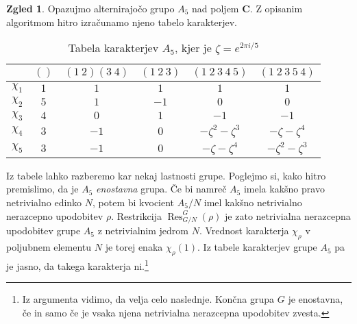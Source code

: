 \documentclass[11pt]{book}
\def\CC{\mathbf{C}}
\DeclareMathOperator\Res{Res}
\theoremstyle{definition}
\theoremstyle{zgled}
\newtheorem*{zgled}{Zgled}
\theoremstyle{odprtproblem}
\theoremstyle{domacanaloga}
\theoremstyle{izrek}
\begin{document}
\begin{zgled}
Opazujmo alternirajočo grupo $A_5$ nad poljem $\CC$. Z opisanim algoritmom hitro izračunamo njeno tabelo karakterjev.

\begin{table}[t]
    \centering
\begin{tabular}{c|ccccc}
    & $()$ & $(1 \ 2)(3 \ 4)$ & $(1 \ 2 \ 3)$ & $(1 \ 2 \ 3 \ 4 \ 5)$ & $(1 \ 2 \ 3 \ 5 \ 4)$ \\ \hline
    $\chi_1$ & $1$ & $1$ & $1$ & $1$ & $1$ \\
    $\chi_2$ & $5$ & $1$ & $-1$ & $0$ & $0$ \\
    $\chi_3$ & $4$ & $0$ & $1$ & $-1$ & $-1$ \\
    $\chi_4$ & $3$ & $-1$ & $0$ & $-\zeta^2-\zeta^3$ & $-\zeta-\zeta^4$ \\
    $\chi_5$ & $3$ & $-1$ & $0$ & $-\zeta-\zeta^4$ & $-\zeta^2-\zeta^3$ \\
\end{tabular}
\caption{Tabela karakterjev $A_5$, kjer je $\zeta = e^{2 \pi i / 5}$}
\end{table}

Iz tabele lahko razberemo kar nekaj lastnosti grupe. Poglejmo si, kako hitro premislimo, da je $A_5$ \emph{enostavna} grupa. Če bi namreč $A_5$ imela kakšno pravo netrivialno edinko $N$, potem bi kvocient $A_5/N$ imel kakšno netrivialno nerazcepno upodobitev $\rho$. Restrikcija $\Res^G_{G/N}(\rho)$ je zato netrivialna nerazcepna upodobitev grupe $A_5$ z netrivialnim jedrom $N$. Vrednost karakterja $\chi_{\rho}$ v poljubnem elementu $N$ je torej enaka $\chi_{\rho}(1)$. Iz tabele karakterjev grupe $A_5$ pa je jasno, da takega karakterja ni.\footnote{Iz argumenta vidimo, da velja celo naslednje. Končna grupa $G$ je enostavna, če in samo če je vsaka njena netrivialna nerazcepna upodobitev zvesta.}
\end{zgled}
\end{document}
